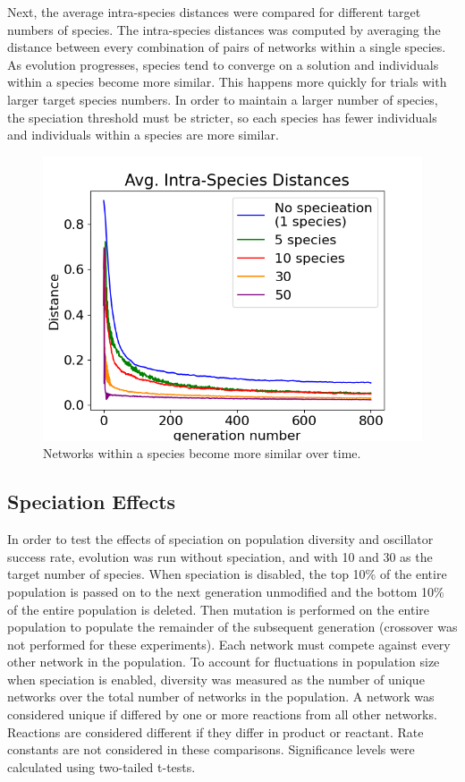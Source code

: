 \documentclass[12pt]{report}
\begin{document}
Next, the average intra-species distances were compared for different target numbers of species. The intra-species distances was computed by averaging the distance between every combination of pairs of networks within a single species. As evolution progresses, species tend to converge on a solution and individuals within a species become more similar. This happens more quickly for trials with larger target species numbers. In order to maintain a larger number of species, the speciation threshold must be stricter, so each species has fewer individuals and individuals within a species are more similar.

\begin{figure}
\centering
    \includegraphics[width=15cm]{images/intraspecies_distance.png}
    \caption[Average intra-species distance over time]{Networks within a species become more similar over time.}
    \label{fig:intra_species_distance}
\end{figure}



\subsection{Speciation Effects}
\label{section:speciation}
In order to test the effects of speciation on population diversity and oscillator success rate, evolution was run without speciation, and with 10 and 30 as the target number of species. When speciation is disabled, the top 10\% of the entire population is passed on to the next generation unmodified and the bottom 10\% of the entire population is deleted. Then mutation is performed on the entire population to populate the remainder of the subsequent generation (crossover was not performed for these experiments). Each network must compete against every other network in the population. To account for fluctuations in population size when speciation is enabled, diversity was measured as the number of unique networks over the total number of networks in the population. A network was considered unique if differed by one or more reactions from all other networks. Reactions are considered different if they differ in product or reactant. Rate constants are not considered in these comparisons. Significance levels were calculated using two-tailed t-tests. 
\end{document}
